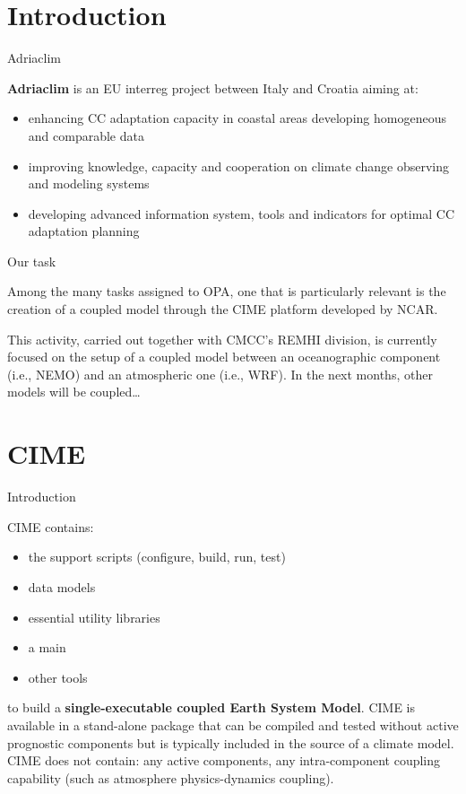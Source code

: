 \section{Introduction}

\begin{frame}{Adriaclim}
    
\textbf{Adriaclim} is an EU interreg project between Italy and Croatia aiming at:

\begin{itemize}
    \item enhancing CC adaptation capacity in coastal areas developing homogeneous and comparable data

    \item improving knowledge, capacity and cooperation on climate change observing and modeling systems

    \item developing advanced information system, tools and indicators for optimal CC adaptation planning 
\end{itemize}
    
\end{frame}

\begin{frame}{Our task}
    
Among the many tasks assigned to OPA, one that is particularly relevant is the creation of a coupled model through the CIME platform developed by NCAR.

This activity, carried out together with CMCC's REMHI division, is currently focused on the setup of a coupled model between an oceanographic component (i.e., NEMO) and an atmospheric one (i.e., WRF). In the next months, other models will be coupled\dots

\end{frame}

\section{CIME}

\begin{frame}{Introduction}

CIME contains:

\begin{itemize}
    \item the support scripts (configure, build, run, test)
    \item data models
    \item essential utility libraries
    \item a main
    \item other tools
\end{itemize}

to build a \textbf{single-executable coupled Earth System Model}. CIME is available in a stand-alone package that can be compiled and tested without active prognostic components but is typically included in the source of a climate model. CIME does not contain: any active components, any intra-component coupling capability (such as atmosphere physics-dynamics coupling).
    
\end{frame}